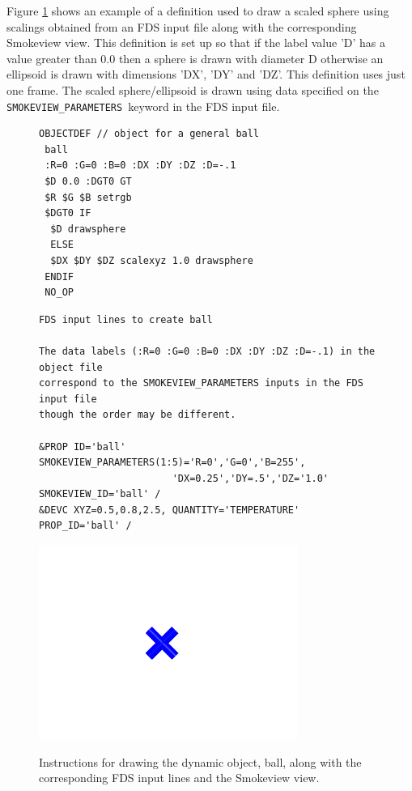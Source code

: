 \documentclass[11pt,twoside]{book}
\newcommand{\figheightA}{2.5in}
\begin{document}
Figure \ref{figball} shows an example of a definition used to draw a scaled sphere using scalings obtained from an FDS input file along with the corresponding Smokeview view.  This definition is set up so that if the label value 'D' has a value greater than 0.0 then a sphere is drawn with diameter D otherwise an ellipsoid is drawn with dimensions 'DX', 'DY' and 'DZ'. This definition uses just one frame. The scaled sphere/ellipsoid is drawn using data specified on the {\tt SMOKEVIEW\_PARAMETERS}\ keyword in the FDS input file.

\begin{figure}[\figoptions]
{\small
\begin{lstlisting}[frame=single,rulecolor=\color{yellow},
framerule=1pt,framesep=1pc,fillcolor=\color{yellow}]
OBJECTDEF // object for a general ball
 ball
 :R=0 :G=0 :B=0 :DX :DY :DZ :D=-.1
 $D 0.0 :DGT0 GT
 $R $G $B setrgb
 $DGT0 IF
  $D drawsphere
  ELSE
  $DX $DY $DZ scalexyz 1.0 drawsphere
 ENDIF
 NO_OP
\end{lstlisting}
}
{\small
\begin{lstlisting}[frame=single,rulecolor=\color{yellow},
framerule=1pt,framesep=1pc,fillcolor=\color{yellow}]
FDS input lines to create ball

The data labels (:R=0 :G=0 :B=0 :DX :DY :DZ :D=-.1) in the object file
correspond to the SMOKEVIEW_PARAMETERS inputs in the FDS input file
though the order may be different.

&PROP ID='ball' SMOKEVIEW_PARAMETERS(1:5)='R=0','G=0','B=255',
                       'DX=0.25','DY=.5','DZ='1.0' SMOKEVIEW_ID='ball' /
&DEVC XYZ=0.5,0.8,2.5, QUANTITY='TEMPERATURE' PROP_ID='ball' /

\end{lstlisting}
}
\begin{center}
\includegraphics[height=\figheightA]{../FDS_User_Guide/SCRIPT_FIGURES/ball}\\
\end{center}
\caption{Instructions for drawing the dynamic object, ball, along with the corresponding FDS input lines and the Smokeview view.}
\label{figball}%
\end{figure}
\end{document}
